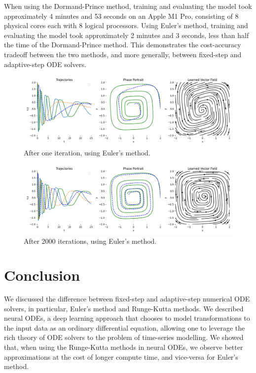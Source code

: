 \documentclass[11pt]{article}
\begin{document}
When using the Dormand-Prince method, training and evaluating the model took approximately 4 minutes and 53 seconds on an Apple M1 Pro, consisting of 8 physical cores each with 8 logical processors. Using Euler's method, training and evaluating the model took approximately 2 minutes and 3 seconds, less than half the time of the Dormand-Prince method. This demonstrates the cost-accuracy tradeoff between the two methods, and more generally, between fixed-step and adaptive-step ODE solvers.


\begin{figure}
  \centering
  \includegraphics*[width=\linewidth]{000_euler.png}
  \caption{After one iteration, using Euler's method.}
  \label{fig:first_iteration_euler}
\end{figure}

\begin{figure}
  \centering
  \includegraphics*[width=\linewidth]{099_euler.png}
  \caption{After 2000 iterations, using Euler's method.}
  \label{fig:last_iteration_euler}
\end{figure}

\section{Conclusion}

We discussed the difference between fixed-step and adaptive-step numerical ODE solvers, in particular, Euler's method and Runge-Kutta methods. We described neural ODEs, a deep learning approach that chooses to model transformations to the input data as an ordinary differential equation, allowing one to leverage the rich theory of ODE solvers to the problem of time-series modelling. We showed that, when using the Runge-Kutta methods in neural ODEs, we observe better approximations at the cost of longer compute time, and vice-versa for Euler's method.
\end{document}

